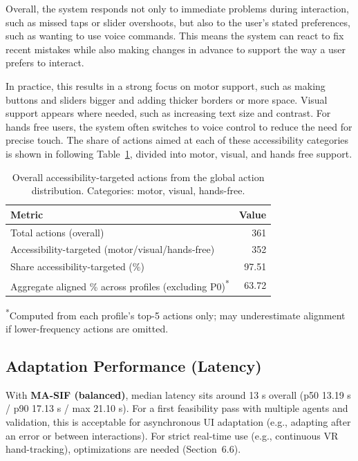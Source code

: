 \documentclass[openany]{book}
\begin{document}
Overall, the system responds not only to immediate problems during interaction, such as missed taps or slider overshoots, but also to the user’s stated preferences, such as wanting to use voice commands. This means the system can react to fix recent mistakes while also making changes in advance to support the way a user prefers to interact.

In practice, this results in a strong focus on motor support, such as making buttons and sliders bigger and adding thicker borders or more space. Visual support appears where needed, such as increasing text size and contrast. For hands free users, the system often switches to voice control to reduce the need for precise touch. The share of actions aimed at each of these accessibility categories is shown in following Table~\ref{tab:overall-accessible-share}, divided into motor, visual, and hands free support.

\begin{table}[htb]
\centering
\caption{Overall accessibility-targeted actions from the global action distribution. Categories: motor, visual, hands-free.}
\label{tab:overall-accessible-share}
\begin{tabular}{l r}
\toprule
\textbf{Metric} & \textbf{Value} \\
\midrule
Total actions (overall) & 361 \\
Accessibility-targeted (motor/visual/hands-free) & 352 \\
Share accessibility-targeted (\%) & 97.51 \\
\midrule
Aggregate aligned \% across profiles (excluding P0)\textsuperscript{*} & 63.72 \\
\bottomrule
\end{tabular}

\smallskip
\raggedright \textsuperscript{*}Computed from each profile's top-5 actions only; may underestimate alignment if lower-frequency actions are omitted.
\end{table}

\subsection{Adaptation Performance (Latency)}
With \textbf{MA-SIF (balanced)}, median latency sits around 13 s overall (p50 13.19 s / p90 17.13 s / max 21.10 s). For a first feasibility pass with multiple agents and validation, this is acceptable for asynchronous UI adaptation (e.g., adapting after an error or between interactions). For strict real-time use (e.g., continuous VR hand-tracking), optimizations are needed (Section~6.6).
\end{document}
